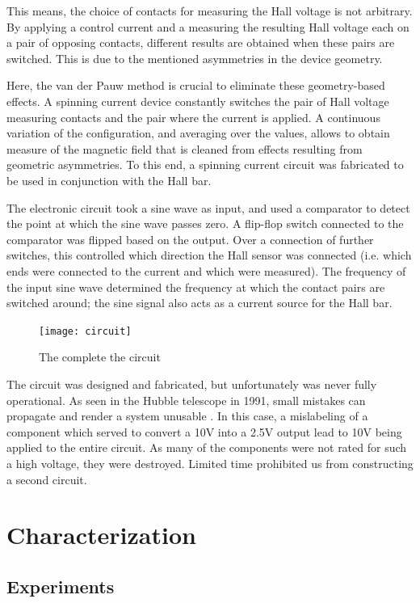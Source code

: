 \documentclass[journal]{IEEEtran}
\begin{document}
This means, the choice of contacts for measuring the Hall voltage is not arbitrary. By applying a control current and a measuring the resulting Hall voltage each on a pair of opposing contacts, different results are obtained when these pairs are switched. This is due to the mentioned asymmetries in the device geometry.


Here, the van der Pauw method \cite{pauw} is crucial to eliminate these geometry-based effects. A spinning current device \cite{steiner} constantly switches the pair of Hall voltage measuring contacts and the pair where the current is applied. A continuous variation of the configuration, and averaging over the values, allows to obtain measure of the magnetic field that is cleaned from effects resulting from geometric asymmetries. To this end, a spinning current circuit was fabricated to be used in conjunction with the Hall bar.

The electronic circuit took a sine wave as input, and used a comparator to detect the point at which the sine wave passes zero. A flip-flop switch connected to the comparator was flipped based on the output. Over a connection of further switches, this controlled which direction the Hall sensor was connected (i.e. which ends were connected to the current and which were measured). The frequency of the input sine wave determined the frequency at which the contact pairs are switched around; the sine signal also acts as a current source for the Hall bar. 

\begin{figure}[H]
\centering
\texttt{[image: circuit]}
\caption{The complete the circuit}
\end{figure}

The circuit was designed and fabricated, but unfortunately was never fully operational. As seen in the Hubble telescope in 1991, small mistakes can propagate and render a system unusable \cite{hubble}. In this case, a mislabeling of a component which served to convert a 10V into a 2.5V output lead to 10V being applied to the entire circuit. As many of the components were not rated for such a high voltage, they were destroyed. Limited time prohibited us from constructing a second circuit. 

\section{Characterization}

\subsection{Experiments}
\end{document}
